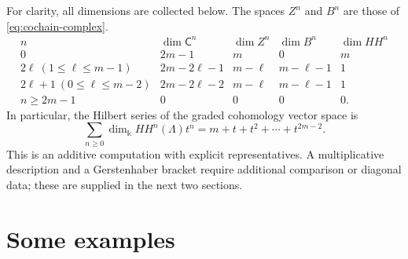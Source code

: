 \documentclass[a4paper,11pt,oneside,reqno]{amsart}
\theoremstyle{definition}
\numberwithin{equation}{section}
\begin{document}
	For clarity, all dimensions are collected below.  The spaces $Z^n$
	and $B^n$ are those of \eqref{eq:cochain-complex}.
	\begin{equation}\label{eq:dimension-table}
		\begin{array}{c|c|c|c|c}
			n&\dim \mathsf C^n&\dim Z^n&\dim B^n&\dim HH^n\\\hline
			0&2m-1&m&0&m\\
			2\ell\ (1\leq\ell\leq m-1)
			&2m-2\ell-1&m-\ell&m-\ell-1&1\\
			2\ell+1\ (0\leq\ell\leq m-2)
			&2m-2\ell-2&m-\ell&m-\ell-1&1\\
			n\geq2m-1&0&0&0&0.
		\end{array}
	\end{equation}
	In particular, the Hilbert series of the graded cohomology vector space is
	\begin{equation}\label{eq:HH-series}
		\sum_{n\geq0}\dim_{\Bbbk}HH^n(\Lambda)t^n
		=m+t+t^2+\cdots+t^{2m-2}.
	\end{equation}
	This is an additive computation with explicit representatives.  A
	multiplicative description and a Gerstenhaber bracket require additional
	comparison or diagonal data; these are supplied in the next two sections.
	
	\section{Some examples}
	
\end{document}
